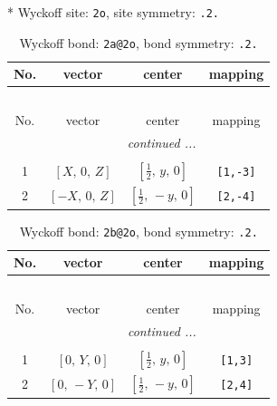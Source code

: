 \documentclass[fleqn,8pt]{jsarticle}
\begin{document}
* Wyckoff site: {\tt 2o}, site symmetry: {\tt .2.}
\renewcommand{\arraystretch}{1.2}
\begin{longtable}{cccc}
\caption{Wyckoff bond: {\tt 2a@2o}, bond symmetry: {\tt .2.}}
 \\
 \hline \hline
No. & vector & center & mapping \\ \hline \endfirsthead

\multicolumn{3}{l}{\tablename\ \thetable{}} \\
 \hline \hline
No. & vector & center & mapping \\ \hline \endhead

 \hline \hline
\multicolumn{3}{r}{\footnotesize\it continued ...} \\ \endfoot

 \hline \hline
\multicolumn{3}{r}{} \\ \endlastfoot

1 & $\left[ X,\, 0,\, Z \right]$ & $\left[ \frac{1}{2},\, y,\, 0 \right]$ & {\tt [1,-3]} \\ \hline
2 & $\left[ - X,\, 0,\, Z \right]$ & $\left[ \frac{1}{2},\, - y,\, 0 \right]$ & {\tt [2,-4]} \\
\end{longtable}
\renewcommand{\arraystretch}{1.2}
\begin{longtable}{cccc}
\caption{Wyckoff bond: {\tt 2b@2o}, bond symmetry: {\tt .2.}}
 \\
 \hline \hline
No. & vector & center & mapping \\ \hline \endfirsthead

\multicolumn{3}{l}{\tablename\ \thetable{}} \\
 \hline \hline
No. & vector & center & mapping \\ \hline \endhead

 \hline \hline
\multicolumn{3}{r}{\footnotesize\it continued ...} \\ \endfoot

 \hline \hline
\multicolumn{3}{r}{} \\ \endlastfoot

1 & $\left[ 0,\, Y,\, 0 \right]$ & $\left[ \frac{1}{2},\, y,\, 0 \right]$ & {\tt [1,3]} \\ \hline
2 & $\left[ 0,\, - Y,\, 0 \right]$ & $\left[ \frac{1}{2},\, - y,\, 0 \right]$ & {\tt [2,4]} \\
\end{longtable}
\renewcommand{\arraystretch}{1.2}
\end{document}
